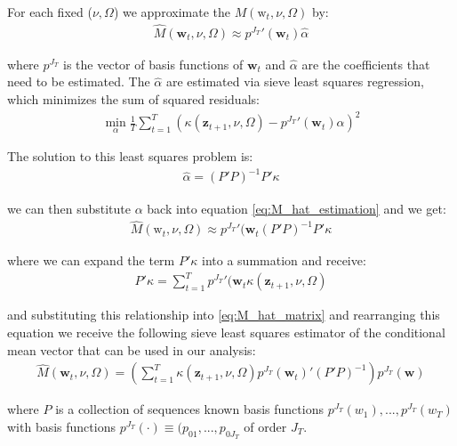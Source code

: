 \documentclass[12pt,a4paper]{article}
\begin{document}
		For each fixed ($\nu, \Omega$) we approximate the  $M(\text{w}_t, \nu, \Omega)$ by:
		\begin{align}
			\hat{M}(\textbf{w}_t, \nu, \Omega) \approx    {p^{J_T}}'(\textbf{w}_t) \hat{\alpha}
			\label{eq:M_hat_estimation}
		\end{align}
		
		where $p^{J_T}$ is the vector of basis functions of $\textbf{w}_t$ and $\hat{\alpha}$ are the coefficients that need to be estimated. The $\hat{\alpha}$ are estimated via sieve least squares regression, which minimizes the sum of squared residuals:
		\begin{align}
			\underset{\alpha}{\min} \frac{1}{T} \sum_{t = 1}^{T} (\kappa(\textbf{z}_{t+1}, \nu, \Omega) - {p^{J_T}}'(\textbf{w}_t) \alpha)^2
		\end{align}
	
		The solution to this least squares problem is:
		\begin{align}
			\hat{\alpha} = (P'P)^{-1} P' \kappa
			\label{eq:M_hat_matrix}
		\end{align}
	
		we can then substitute $\alpha$ back into equation \ref{eq:M_hat_estimation} and we get:
		\begin{align}
		\hat{M}(\text{w}_t, \nu, \Omega) \approx    {p^{J_T}}'(\textbf{w}_t (P'P)^{-1} P' \kappa
		\label{eq:m_hat_estimation_2}
		\end{align}
	
		where we can expand the term $P' \kappa$ into a summation and receive:
		\begin{align}
			P' \kappa = \sum_{t = 1}^{T} {p^{J_T}}'(\textbf{w}_t \kappa(\textbf{z}_{t+1}, \nu, \Omega)
		\end{align}
	
		and substituting this relationship into \ref{eq:M_hat_matrix} and rearranging this equation we receive the following sieve least squares estimator of the conditional mean vector that can be used in our analysis:
		\begin{align}
			\hat{M}(\textbf{w}_t, \nu, \Omega) = \left( \sum_{t=1}^{T} \kappa(\textbf{z}_{t+1}, \nu, \Omega)  p^{J_T}(\textbf{w}_t)' (P'P)^{-1} \right)  p^{J_T}(\textbf{w})
			\label{eq:M_HAT_Finals}
		\end{align}
	
		where $P$ is a collection of sequences known basis functions $p^{J_T}(w_1), ..., p^{J_T}(w_T)$ with basis functions $p^{J_T}(\cdot) \equiv (p_{01}, ..., p_{0J_T}$ of order $J_T$.
		
\end{document}
